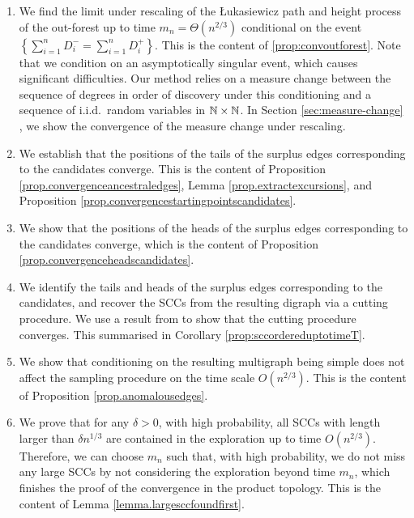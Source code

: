 \begin{enumerate}
    \item We find the limit under rescaling of the \L ukasiewicz path and height process of the out-forest up to time $m_n=\Theta(n^{2/3})$ conditional on the event $\left\{\sum_{i=1}^n D^-_i=\sum_{i=1}^n D^+_i\right\}$. This is the content of  \cref{prop:convoutforest}. Note that we condition on an asymptotically singular event, which causes significant difficulties.   Our method relies on a measure change between the sequence of degrees in order of discovery under this conditioning and a sequence of i.i.d.\ random variables in ${\mathbb N}\times{\mathbb N}$. In Section \ref{sec:measure-change} , we show the convergence of the measure change under rescaling.
    \item We establish that the positions of the tails of the surplus edges corresponding to the candidates converge. This is the content of Proposition \ref{prop.convergenceancestraledges}, Lemma \ref{prop.extractexcursions}, and Proposition \ref{prop.convergencestartingpointscandidates}.
    \item We show that the positions of the heads of the surplus edges corresponding to the candidates converge, which is the content of Proposition \ref{prop.convergenceheadscandidates}. 
    \item We identify the tails and heads of the surplus edges corresponding to the candidates, and recover the SCCs from the resulting digraph via a cutting procedure. We use a result from \cite{goldschmidtScalingLimitCritical2019} to show that the cutting procedure converges. This summarised in Corollary \ref{prop:sccordereduptotimeT}.
    \item We show that conditioning on the resulting multigraph being simple does not affect the sampling procedure on the time scale $O(n^{2/3})$. This is the content of Proposition \ref{prop.anomalousedges}. 
    \item We prove that for any $\delta>0$, with high probability, all SCCs with length larger than $\delta n^{1/3}$ are contained in the exploration up to time $O(n^{2/3})$. Therefore, we can choose $m_n$ such that, with high probability, we do not miss any large SCCs by not considering the exploration beyond time $m_n$, which finishes the proof of the convergence in the product topology. This is the content of Lemma \ref{lemma.largesccfoundfirst}. 
\end{enumerate}



